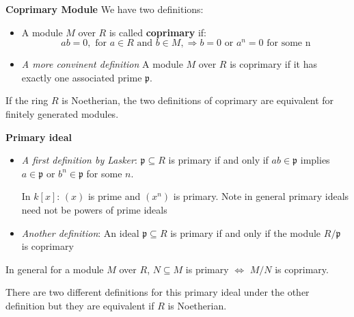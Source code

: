 \begin{definition}\textbf{Coprimary Module}
    We have two definitions:\begin{itemize}
        \item A module $M$ over $R$ is called \textbf{coprimary} if:
        \begin{equation*} ab = 0, \text{ for }a\in R\text{ and }b\in M, \Rightarrow b=0\text{ or }a^n=0\text{ for some n} \tag{$\dagger$}\end{equation*}
        \item\textit{A more convinent definition} A module $M$ over $R$ is coprimary if it has exactly one associated prime $\mathfrak{p}$.  
    \end{itemize}
\end{definition}

\begin{remark}
    If the ring $R$ is Noetherian, the two definitions of coprimary are equivalent for finitely generated modules.
\end{remark}

\begin{definition}\textbf{Primary ideal}
\begin{itemize}
    \item  \textit{A first definition by Lasker}: $\mathfrak{p}\subseteq R$ is primary if and only if $ab\in \mathfrak{p}$ implies $a\in \mathfrak{p}$ or $b^n\in \mathfrak{p}$ for some $n$.
    \begin{example}
        In $k[x]$: $(x)$ is prime and $(x^n)$ is primary. Note in general primary ideals need not be powers of prime ideals
    \end{example}

    \item \textit{Another definition}: An ideal $\mathfrak{p}\subseteq R$ is primary if and only if the module $R/\mathfrak{p}$ is coprimary
\end{itemize}
\begin{remark}
    In general for a module $M$ over $R$, $N\subseteq M$ is primary $\iff$ $M/N$ is coprimary.
\end{remark}
There are two different definitions for this primary ideal under the other definition but they are equivalent if $R$ is Noetherian.       
\end{definition}

